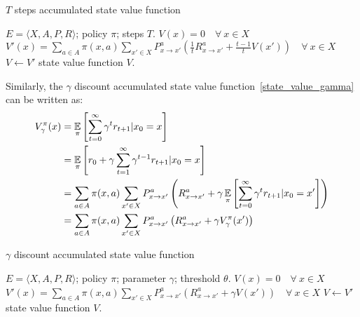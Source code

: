 \begin{algorithm}
    \caption{$T$ steps accumulated state value function}
    \begin{algorithmic}[1]
        \Require $E = \langle X, A, P, R\rangle$; policy $\pi$; steps $T$.
        \State $V(x) = 0\quad\forall~x\in X$
            \State $\displaystyle V'(x) = \sum_{a\in A}\pi(x,a)\sum_{x'\in X}P_{x\rightarrow x'}^a 
            \left(\frac{1}{t} R_{x\rightarrow x'}^a + \frac{t-1}{t}V(x')\right)\quad\forall~x\in X$
                \State \algorithmicbreak
            \Else
                \State $V \gets V'$
            \EndIf
        \EndFor
        \Ensure state value function $V$.
    \end{algorithmic}
\end{algorithm}

Similarly, the $\gamma$ discount accumulated state value function~\eqref{state_value_gamma} can be written as:
\begin{align}
    V^\pi_\gamma(x) &= \operatorname*{\mathbb{E}}_\pi\left[\sum_{t=0}^\infty \gamma^t r_{t+1} | x_0 = x\right]\nonumber\\
                    &= \operatorname*{\mathbb{E}}_\pi\left[r_0 + \gamma \sum_{t=1}^\infty \gamma^{t-1}r_{t+1} | x_0=x\right]\nonumber\\
                    &= \sum_{a\in A}\pi(x, a)\sum_{x'\in X}P_{x\rightarrow x'}^a \left(R_{x\rightarrow x'}^a + 
                    \gamma \operatorname*{\mathbb{E}}_\pi\left[\sum_{t=0}^\infty \gamma^t r_{t+1} | x_0 = x'\right]\right)\nonumber\\
                    &= \sum_{a\in A}\pi(x, a)\sum_{x'\in X}P_{x\rightarrow x'}^a \left(R_{x\rightarrow x'}^a +
                    \gamma V^\pi_\gamma(x')\right)\label{state_value_gamma_expansion}
\end{align}

\begin{algorithm}
    \caption{$\gamma$ discount accumulated state value function}
    \begin{algorithmic}[1]
        \Require $E = \langle X, A, P, R\rangle$; policy $\pi$; parameter $\gamma$; threshold $\theta$.
        \State $V(x) = 0\quad\forall~x\in X$
        \Loop
            \State $\displaystyle V'(x) = \sum_{a\in A}\pi(x,a)\sum_{x'\in X}P_{x\rightarrow x'}^a 
            \left(R_{x\rightarrow x'}^a + \gamma V(x')\right)\quad\forall~x\in X$
                \State \algorithmicbreak
            \Else
                \State $V \gets V'$
            \EndIf
        \EndLoop
        \Ensure state value function $V$.
    \end{algorithmic}
\end{algorithm}

